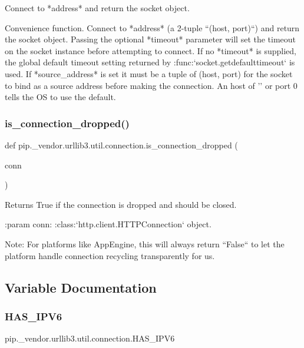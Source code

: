 \begin{DoxyVerb}Connect to *address* and return the socket object.

Convenience function.  Connect to *address* (a 2-tuple ``(host,
port)``) and return the socket object.  Passing the optional
*timeout* parameter will set the timeout on the socket instance
before attempting to connect.  If no *timeout* is supplied, the
global default timeout setting returned by :func:`socket.getdefaulttimeout`
is used.  If *source_address* is set it must be a tuple of (host, port)
for the socket to bind as a source address before making the connection.
An host of '' or port 0 tells the OS to use the default.
\end{DoxyVerb}
 \mbox{\label{namespacepip_1_1__vendor_1_1urllib3_1_1util_1_1connection_a6c618fbfddec1d95e0e68c3264af79b8}} 
\subsubsection{\texorpdfstring{is\+\_\+connection\+\_\+dropped()}{is\_connection\_dropped()}}
{\footnotesize\ttfamily def pip.\+\_\+vendor.\+urllib3.\+util.\+connection.\+is\+\_\+connection\+\_\+dropped (\begin{DoxyParamCaption}\item[{}]{conn }\end{DoxyParamCaption})}

\begin{DoxyVerb}Returns True if the connection is dropped and should be closed.

:param conn:
    :class:`http.client.HTTPConnection` object.

Note: For platforms like AppEngine, this will always return ``False`` to
let the platform handle connection recycling transparently for us.
\end{DoxyVerb}
 

\subsection{Variable Documentation}
\mbox{\label{namespacepip_1_1__vendor_1_1urllib3_1_1util_1_1connection_a6373d0f057a94f482db77884d8310280}} 
\subsubsection{\texorpdfstring{H\+A\+S\+\_\+\+I\+P\+V6}{HAS\_IPV6}}
{\footnotesize\ttfamily pip.\+\_\+vendor.\+urllib3.\+util.\+connection.\+H\+A\+S\+\_\+\+I\+P\+V6}

